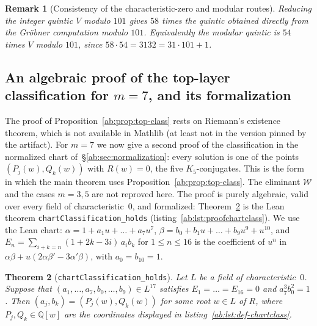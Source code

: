 \documentclass[a4paper,11pt]{article}
\theoremstyle{jsplain}
\newtheorem{theorem}{Theorem}[section]
\theoremstyle{jsdef}
\theoremstyle{jsrem}
\newtheorem{remark}[theorem]{Remark}
\begin{document}
\begin{remark}[Consistency of the characteristic-zero and modular routes]
Reducing the integer quintic $V$ modulo $101$ gives $58$ times the quintic obtained directly from the Gr\"obner computation modulo $101$. Equivalently the modular quintic is $54$ times $V$ modulo $101$, since $58\cdot54=3132=31\cdot101+1$.
\end{remark}

\subsection{An algebraic proof of the top-layer classification for \texorpdfstring{$m=7$}{m=7}, and its formalization}\label{ab:sec:chartproof}

The proof of Proposition~\ref{ab:prop:top-class} rests on Riemann's existence theorem, which is not available in Mathlib (at least not in the version pinned by the artifact). For $m=7$ we now give a second proof of the classification in the normalized chart of~\S\ref{ab:sec:normalization}: every solution is one of the points $(P_j(w),Q_k(w))$ with $R(w)=0$, the five $K_5$-conjugates. This is the form in which the main theorem uses Proposition~\ref{ab:prop:top-class}. The eliminant $\mathcal{W}$ and the cases $m=3,5$ are not reproved here. The proof is purely algebraic, valid over every field of characteristic~$0$, and formalized: Theorem~\ref{ab:thm:chartclass} is the Lean theorem \texttt{chartClassification\_\allowbreak{}holds} (listing~\ref{ab:lst:proofchartclass}). We use the Lean chart: $\alpha=1+a_1u+\dots+a_7u^7$, $\beta=b_0+b_1u+\dots+b_9u^9+u^{10}$, and $E_n=\sum_{i+k=n}(1+2k-3i)\,a_ib_k$ for $1\le n\le 16$ is the coefficient of $u^n$ in $\alpha\beta+u(2\alpha\beta'-3\alpha'\beta)$, with $a_0=b_{10}=1$.

\begin{theorem}[\texttt{chartClassification\_\allowbreak{}holds}]\label{ab:thm:chartclass}
Let $L$ be a field of characteristic~$0$. Suppose that $(a_1,\dots,a_7,b_0,\dots,b_9)\in L^{17}$ satisfies $E_1=\dots=E_{16}=0$ and $a_7^3b_0^2=1$. Then $(a_j,b_k)=(P_j(w),Q_k(w))$ for some root $w\in L$ of $R$, where $P_j,Q_k\in\mathbb{Q}[w]$ are the coordinates displayed in listing~\ref{ab:lst:def-chartclass}.
\end{theorem}
\end{document}
